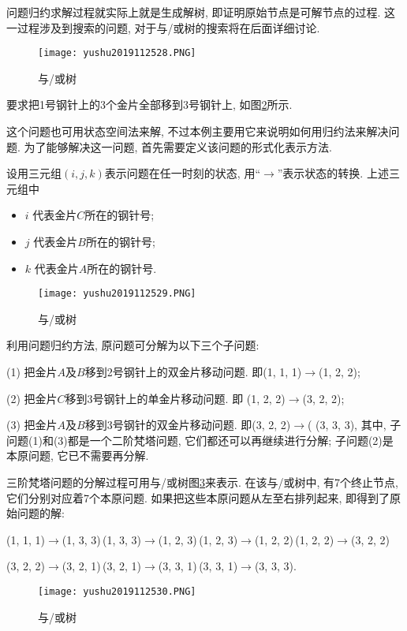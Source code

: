 问题归约求解过程就实际上就是生成解树, 即证明原始节点是可解节点的过程. 这一过程涉及到搜索的问题, 对于与/或树的搜索将在后面详细讨论.
\begin{figure}[H]
\centering
\texttt{[image: yushu2019112528.PNG]}
\caption{与/或树 }
\label{AI32fig28}
\end{figure}
\begin{example}
   要求把1号钢针上的3个金片全部移到3号钢针上, 如图\ref{AI32fig29}所示.
\end{example}
\begin{answer}
这个问题也可用状态空间法来解, 不过本例主要用它来说明如何用归约法来解决问题.
为了能够解决这一问题, 首先需要定义该问题的形式化表示方法.

设用三元组$(i, j, k)$表示问题在任一时刻的状态, 用“$\rightarrow$”表示状态的转换. 上述三元组中
\begin{itemize}
\item $i$ 代表金片$C$所在的钢针号;
\item $j$ 代表金片$B$所在的钢针号;
\item $k$ 代表金片$A$所在的钢针号.
\end{itemize}
\begin{figure}[H]
\centering
\texttt{[image: yushu2019112529.PNG]}
\caption{与/或树 }
\label{AI32fig29}
\end{figure}
利用问题归约方法, 原问题可分解为以下三个子问题:

(1) 把金片$A$及$B$移到2号钢针上的双金片移动问题. 即(1, 1, 1)$\rightarrow$(1, 2, 2);

(2) 把金片$C$移到3号钢针上的单金片移动问题. 即 (1, 2, 2)$\rightarrow$(3, 2, 2);

(3) 把金片$A$及$B$移到3号钢针的双金片移动问题. 即(3, 2, 2)$\rightarrow$( (3, 3, 3), 其中, 子问题(1)和(3)都是一个二阶梵塔问题, 它们都还可以再继续进行分解; 子问题(2)是本原问题, 它已不需要再分解.

三阶梵塔问题的分解过程可用与/或树图\ref{AI32fig2019120230}来表示.
在该与/或树中, 有7个终止节点, 它们分别对应着7个本原问题. 如果把这些本原问题从左至右排列起来, 即得到了原始问题的解:

(1, 1, 1)$\rightarrow$(1, 3, 3)\,(1, 3, 3)$\rightarrow$(1, 2, 3)\,(1, 2, 3)$\rightarrow$(1, 2, 2)\,(1, 2, 2)$\rightarrow$(3, 2, 2)

(3, 2, 2)$\rightarrow$(3, 2, 1)\,(3, 2, 1)$\rightarrow$(3, 3, 1)\,(3, 3, 1)$\rightarrow$(3, 3, 3).
\begin{figure}[H]
\centering
\texttt{[image: yushu2019112530.PNG]}
\caption{与/或树 }
\label{AI32fig2019120230}
\end{figure}
\end{answer}
